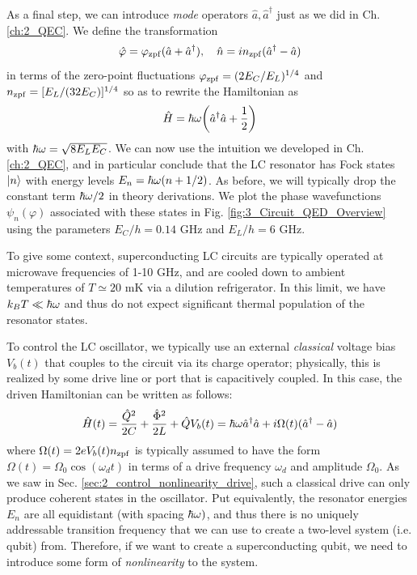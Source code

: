 As a final step, we can introduce \textit{mode} operators $\hat{a}, \hat{a}^\dagger$ just as we did in Ch. \ref{ch:2_QEC}. We define the transformation
\begin{equation}
    \hat{\varphi} = \varphi_{\rm zpf}(\hat{a} + \hat{a}^\dagger), \quad \hat{n} = in_{\rm zpf}(\hat{a}^\dagger - \hat{a})
\end{equation}
in terms of the zero-point fluctuations $\varphi_{\rm zpf} = (2E_C/E_L)^{1/4}$ and $n_{\rm zpf} =  [E_L/(32E_C)]^{1/4}$ so as to rewrite the Hamiltonian as
\begin{equation}
    \hat{H} = \hbar\omega\bigg(\hat{a}^\dagger\hat{a} + \frac{1}{2}\bigg)
    \label{eq:3_LC_QHO}
\end{equation}
with $\hbar\omega = \sqrt{8 E_LE_C}$. We can now use the intuition we developed in Ch. \ref{ch:2_QEC}, and in particular conclude that the LC resonator has Fock states $\lvert n\rangle$ with energy levels $E_n = \hbar\omega(n+1/2)$. As before, we will typically drop the constant term $\hbar\omega/2$ in theory derivations. We plot the phase wavefunctions $\psi_n(\varphi)$ associated with these states in Fig. \ref{fig:3_Circuit_QED_Overview} using the parameters $E_C/h = 0.14$ GHz and $E_L/h = 6$ GHz. 

To give some context, superconducting LC circuits are typically operated at microwave frequencies of 1-10 GHz, and are cooled down to ambient temperatures of $T \simeq 20$ mK via a dilution refrigerator. In this limit, we have $k_BT \ll \hbar\omega$ and thus do not expect significant thermal population of the resonator states. 

To control the LC oscillator, we typically use an external \textit{classical} voltage bias $V_b(t)$ that couples to the circuit via its charge operator; physically, this is realized by some drive line or port that is capacitively coupled. In this case, the driven Hamiltonian can be written as follows:
\begin{equation}
    \hat{H}(t) = \frac{\hat{Q}^2}{2C} + \frac{\hat{\Phi}^2}{2L} + \hat{Q}V_b(t) = \hbar\omega\hat{a}^\dagger\hat{a} + i\Omega(t) (\hat{a}^\dagger - \hat{a})
\end{equation}
where $\Omega(t) = 2eV_b(t)n_{\rm zpf}$ is typically assumed to have the form $\Omega(t) = \Omega_0\cos(\omega_d t)$ in terms of a drive frequency $\omega_d$ and amplitude $\Omega_0$. As we saw in Sec. \ref{sec:2_control_nonlinearity_drive}, such a classical drive can only produce coherent states in the oscillator. Put equivalently, the resonator energies $E_n$ are all equidistant (with spacing $\hbar\omega)$, and thus there is no uniquely addressable transition frequency that we can use to create a two-level system (i.e. qubit) from. Therefore, if we want to create a superconducting qubit, we need to introduce some form of \textit{nonlinearity} to the system. 


